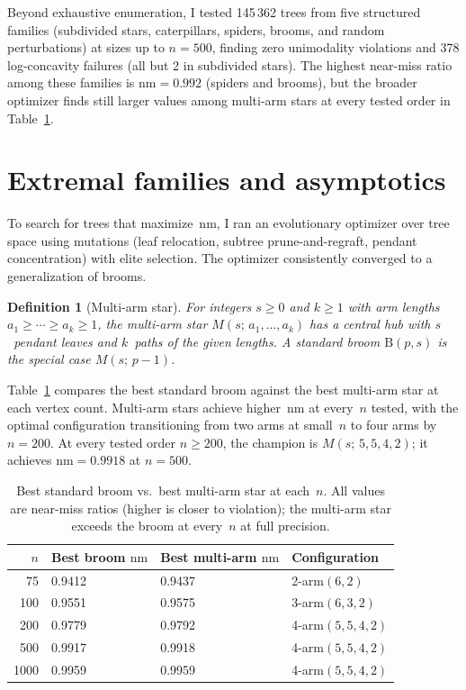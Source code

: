 \documentclass[12pt,oneside]{article}
\newtheorem{definition}[theorem]{Definition}
\theoremstyle{remark}
\newcommand{\nm}{\mathrm{nm}}             %
\newcommand{\broom}{\mathrm{B}}           %
\begin{document}
Beyond exhaustive enumeration, I tested 145\,362 trees from five structured families (subdivided stars, caterpillars, spiders, brooms, and random perturbations) at sizes up to $n = 500$, finding zero unimodality violations and 378 log-concavity failures (all but 2 in subdivided stars).
The highest near-miss ratio among these families is $\nm = 0.992$ (spiders and brooms), but the broader optimizer finds still larger values among multi-arm stars at every tested order in Table~\ref{tab:multiarm}.


\section{Extremal families and asymptotics}\label{sec:extremal}

To search for trees that maximize~$\nm$, I ran an evolutionary optimizer over tree space using mutations (leaf relocation, subtree prune-and-regraft, pendant concentration) with elite selection.
The optimizer consistently converged to a generalization of brooms.

\begin{definition}[Multi-arm star]\label{def:multiarm}
  For integers $s \ge 0$ and $k \ge 1$ with arm lengths $a_1 \ge \cdots \ge a_k \ge 1$, the \emph{multi-arm star} $M(s;\, a_1, \dotsc, a_k)$ has a central hub with $s$~pendant leaves and $k$~paths of the given lengths.
  A standard broom $\broom(p,s)$ is the special case $M(s;\, p{-}1)$.
\end{definition}

Table~\ref{tab:multiarm} compares the best standard broom against the best multi-arm star at each vertex count.
Multi-arm stars achieve higher~$\nm$ at every~$n$ tested, with the optimal configuration transitioning from two arms at small~$n$ to four arms by $n = 200$.
At every tested order $n\ge200$, the champion is $M(s;\, 5, 5, 4, 2)$; it achieves $\nm = 0.9918$ at $n = 500$.

\begin{table}[ht]
  \centering
  \caption{Best standard broom vs.\ best multi-arm star at each~$n$.
    All values are near-miss ratios (higher is closer to violation); the multi-arm star exceeds the broom at every~$n$ at full precision.}
  \label{tab:multiarm}
  \begin{tabular}{r l l l}
    \toprule
    $n$ & Best broom $\nm$ & Best multi-arm $\nm$ & Configuration \\
    \midrule
    75   & 0.9412 & 0.9437 & 2-arm$(6,2)$ \\
    100  & 0.9551 & 0.9575 & 3-arm$(6,3,2)$ \\
    200  & 0.9779 & 0.9792 & 4-arm$(5,5,4,2)$ \\
    500  & 0.9917 & 0.9918 & 4-arm$(5,5,4,2)$ \\
    1000 & 0.9959 & 0.9959 & 4-arm$(5,5,4,2)$ \\
    \bottomrule
  \end{tabular}
\end{table}
\end{document}
